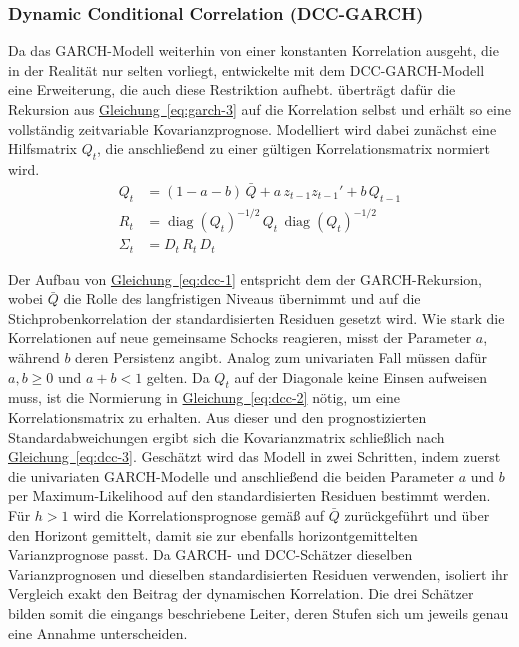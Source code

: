 \documentclass[a4paper, 12pt]{article}
\begin{document}
\subsubsection{Dynamic Conditional Correlation (DCC-GARCH)}
Da das GARCH-Modell weiterhin von einer konstanten Korrelation ausgeht, die in der Realität nur selten vorliegt, entwickelte \textcite{engle2002} mit dem DCC-GARCH-Modell eine Erweiterung, die auch diese Restriktion aufhebt.
\citeauthor{engle2002} überträgt dafür die Rekursion aus \hyperref[eq:garch-3]{Gleichung~\ref*{eq:garch-3}} auf die Korrelation selbst und erhält so eine vollständig zeitvariable Kovarianzprognose.
Modelliert wird dabei zunächst eine Hilfsmatrix $Q_t$, die anschließend zu einer gültigen Korrelationsmatrix normiert wird.
\begin{align}
	\label{eq:dcc-1}
	Q_t &= (1 - a - b)\,\bar{Q} + a\,z_{t-1}z_{t-1}' + b\,Q_{t-1} \\
	\label{eq:dcc-2}
	R_t &= \operatorname{diag}(Q_t)^{-1/2}\,Q_t\,\operatorname{diag}(Q_t)^{-1/2} \\
	\label{eq:dcc-3}
	\Sigma_t &= D_t\,R_t\,D_t
\end{align}

Der Aufbau von \hyperref[eq:dcc-1]{Gleichung~\ref*{eq:dcc-1}} entspricht dem der GARCH-Rekursion, wobei $\bar{Q}$ die Rolle des langfristigen Niveaus übernimmt und auf die Stichprobenkorrelation der standardisierten Residuen gesetzt wird.
Wie stark die Korrelationen auf neue gemeinsame Schocks reagieren, misst der Parameter $a$, während $b$ deren Persistenz angibt.
Analog zum univariaten Fall müssen dafür $a, b \geq 0$ und $a + b < 1$ gelten.
Da $Q_t$ auf der Diagonale keine Einsen aufweisen muss, ist die Normierung in \hyperref[eq:dcc-2]{Gleichung~\ref*{eq:dcc-2}} nötig, um eine Korrelationsmatrix zu erhalten.
Aus dieser und den prognostizierten Standardabweichungen ergibt sich die Kovarianzmatrix schließlich nach \hyperref[eq:dcc-3]{Gleichung~\ref*{eq:dcc-3}}.
Geschätzt wird das Modell in zwei Schritten, indem zuerst die univariaten GARCH-Modelle und anschließend die beiden Parameter $a$ und $b$ per Maximum-Likelihood auf den standardisierten Residuen bestimmt werden.
Für $h > 1$ wird die Korrelationsprognose gemäß \textcite{engle2001} auf $\bar{Q}$ zurückgeführt und über den Horizont gemittelt, damit sie zur ebenfalls horizontgemittelten Varianzprognose passt.
Da GARCH- und DCC-Schätzer dieselben Varianzprognosen und dieselben standardisierten Residuen verwenden, isoliert ihr Vergleich exakt den Beitrag der dynamischen Korrelation.
Die drei Schätzer bilden somit die eingangs beschriebene Leiter, deren Stufen sich um jeweils genau eine Annahme unterscheiden.
\end{document}
